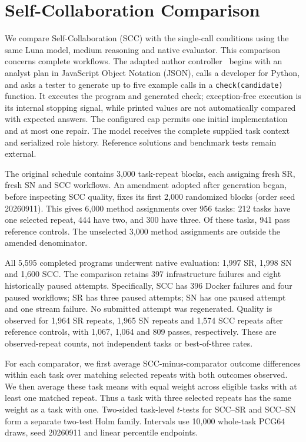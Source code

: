 \section{Self-Collaboration Comparison}
\aieditnote
We compare Self-Collaboration (SCC) with the single-call conditions using the same Luna model, medium reasoning and native evaluator. This comparison concerns complete workflows. The adapted author controller~\cite{scc2024source} begins with an analyst plan in JavaScript Object Notation (JSON), calls a developer for Python, and asks a tester to generate up to five example calls in a \texttt{check(candidate)} function. It executes the program and generated check; exception-free execution is its internal stopping signal, while printed values are not automatically compared with expected answers. The configured cap permits one initial implementation and at most one repair. The model receives the complete supplied task context and serialized role history. Reference solutions and benchmark tests remain external.

The original schedule contains 3,000 task-repeat blocks, each assigning fresh SR, fresh SN and SCC workflows. An amendment adopted after generation began, before inspecting SCC quality, fixes its first 2,000 randomized blocks (order seed 20260911). This gives 6,000 method assignments over 956 tasks: 212 tasks have one selected repeat, 444 have two, and 300 have three. Of these tasks, 941 pass reference controls. The unselected 3,000 method assignments are outside the amended denominator.

All 5,595 completed programs underwent native evaluation: 1,997 SR, 1,998 SN and 1,600 SCC. The comparison retains 397 infrastructure failures and eight historically paused attempts. Specifically, SCC has 396 Docker failures and four paused workflows; SR has three paused attempts; SN has one paused attempt and one stream failure. No submitted attempt was regenerated. Quality is observed for 1,964 SR repeats, 1,965 SN repeats and 1,574 SCC repeats after reference controls, with 1,067, 1,064 and 809 passes, respectively. These are observed-repeat counts, not independent tasks or best-of-three rates.

For each comparator, we first average SCC-minus-comparator outcome differences within each task over matching selected repeats with both outcomes observed. We then average these task means with equal weight across eligible tasks with at least one matched repeat. Thus a task with three selected repeats has the same weight as a task with one. Two-sided task-level $t$-tests for SCC--SR and SCC--SN form a separate two-test Holm family. Intervals use 10,000 whole-task PCG64 draws, seed 20260911 and linear percentile endpoints.

